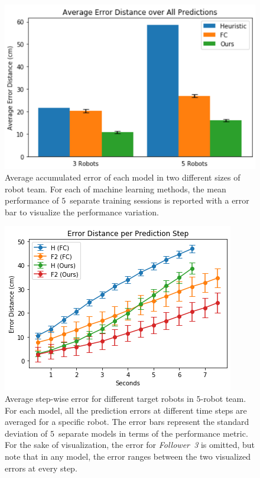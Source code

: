 \documentclass[letterpaper, 10 pt, conference]{ieeeconf}  %
\begin{document}

	\begin{figure}[t]
	\centering
	\includegraphics[width=1.\columnwidth]{fig_macro_eval}
	\caption{Average accumulated error of each model in two different sizes of robot team.
		For each of machine learning methods, the mean performance of $5$~separate training
		sessions is reported with a error bar to visualize the performance variation.
	}
	\label{fig:macro_eval}
	\end{figure}


	\begin{figure}[t]
		\centering
		\includegraphics[width=1.\columnwidth]{fig_micro_eval}
		\caption{Average step-wise error for different target robots in $5$-robot team.
			For each model, all the prediction errors at different time steps are averaged
			for a specific robot. The error bars represent the standard deviation of
			$5$~separate models in terms of the performance metric. For the sake of
			visualization, the error for \emph{Follower~3} is omitted, but note that
			in any model, the error ranges between the two visualized errors at every step.
		}
		\label{fig:micro_eval}
	\end{figure}
\end{document}
